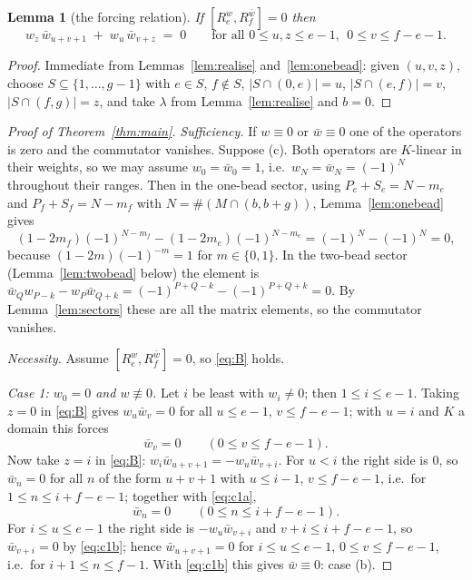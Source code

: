 \documentclass[11pt]{article}
\newtheorem{lemma}[theorem]{Lemma}
\theoremstyle{definition}
\begin{document}
\begin{lemma}[the forcing relation]\label{lem:B}
If $[R_e^{w},R_f^{\bar w}]=0$ then
\begin{equation}\label{eq:B}
   w_z\,\bar w_{u+v+1}\;+\;w_u\,\bar w_{v+z}\;=\;0
   \qquad\text{for all } 0\le u,z\le e-1,\ \ 0\le v\le f-e-1 .
\end{equation}
\end{lemma}

\begin{proof}
Immediate from Lemmas~\ref{lem:realise} and~\ref{lem:onebead}: given $(u,v,z)$, choose
$S\subseteq\{1,\dots,g-1\}$ with $e\in S$, $f\notin S$, $|S\cap(0,e)|=u$,
$|S\cap(e,f)|=v$, $|S\cap(f,g)|=z$, and take $\lambda$ from Lemma~\ref{lem:realise} and
$b=0$.
\end{proof}

\begin{proof}[Proof of Theorem~\ref{thm:main}]
\emph{Sufficiency.}  If $w\equiv0$ or $\bar w\equiv0$ one of the operators is zero and
the commutator vanishes.  Suppose (c).  Both operators are $K$-linear in their weights,
so we may assume $w_0=\bar w_0=1$, i.e.\ $w_N=\bar w_N=(-1)^N$ throughout their ranges.
Then in the one-bead sector, using $P_e+S_e=N-m_e$ and $P_f+S_f=N-m_f$ with
$N=\#(M\cap(b,b+g))$, Lemma~\ref{lem:onebead} gives
\[
  (1-2m_f)(-1)^{N-m_f}-(1-2m_e)(-1)^{N-m_e}=(-1)^N-(-1)^N=0,
\]
because $(1-2m)(-1)^{-m}=1$ for $m\in\{0,1\}$.  In the two-bead sector
(Lemma~\ref{lem:twobead} below) the element is
$\bar w_Q w_{P-k}-w_P\bar w_{Q+k}=(-1)^{P+Q-k}-(-1)^{P+Q+k}=0$.  By
Lemma~\ref{lem:sectors} these are all the matrix elements, so the commutator vanishes.

\emph{Necessity.}  Assume $[R_e^{w},R_f^{\bar w}]=0$, so \eqref{eq:B} holds.

\emph{Case 1: $w_0=0$ and $w\not\equiv0$.}  Let $i$ be least with $w_i\ne0$; then
$1\le i\le e-1$.  Taking $z=0$ in \eqref{eq:B} gives $w_u\bar w_v=0$ for all
$u\le e-1$, $v\le f-e-1$; with $u=i$ and $K$ a domain this forces
\begin{equation}\label{eq:c1a}
  \bar w_v=0\qquad (0\le v\le f-e-1).
\end{equation}
Now take $z=i$ in \eqref{eq:B}:  $w_i\bar w_{u+v+1}=-w_u\bar w_{v+i}$.
For $u<i$ the right side is $0$, so $\bar w_n=0$ for all $n$ of the form $u+v+1$ with
$u\le i-1$, $v\le f-e-1$, i.e.\ for $1\le n\le i+f-e-1$; together with \eqref{eq:c1a},
\begin{equation}\label{eq:c1b}
  \bar w_n=0\qquad(0\le n\le i+f-e-1).
\end{equation}
For $i\le u\le e-1$ the right side is $-w_u\bar w_{v+i}$ and $v+i\le i+f-e-1$, so
$\bar w_{v+i}=0$ by \eqref{eq:c1b}; hence $\bar w_{u+v+1}=0$ for
$i\le u\le e-1$, $0\le v\le f-e-1$, i.e.\ for $i+1\le n\le f-1$.  With \eqref{eq:c1b}
this gives $\bar w\equiv0$: case (b).


\end{proof}
\end{document}
